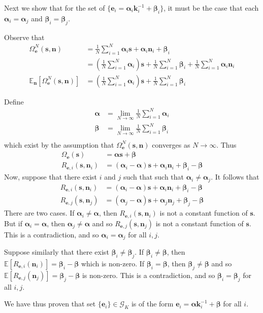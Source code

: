 \documentclass[letterpaper]{article}
\theoremstyle{definition}
\begin{document}
Next we show that for the set of $\{\bm{e}_i = \bm{\alpha}_i \bm{k}_i^{-1} + \bm{\beta}_i\}$, it must be the case that each $\bm{\alpha}_i = \bm{\alpha}_j$ and $\bm{\beta}_i = \bm{\beta}_j$.

Observe that
\begin{align*}
    \Omega_{\bm{e}}^N(\bm{s}, \bm{n}) &= \frac{1}{N} \sum_{i=1}^N \bm{\alpha}_i \bm{s} + \bm{\alpha}_i \bm{n}_i + \bm{\beta}_i \\
    &= \left( \frac{1}{N} \sum_{i=1}^N \bm{\alpha}_i \right)\bm{s} + \frac{1}{N} \sum_{i=1}^N \bm{\beta}_i  + \frac{1}{N} \sum_{i=1}^N \bm{\alpha}_i \bm{\bm{n}}_i \\
    \mathbb{E}_{\bm{n}}[\Omega_{\bm{e}}^N(\bm{s}, \bm{n})] &= \left( \frac{1}{N} \sum_{i=1}^N \bm{\alpha}_i \right)\bm{s} +  \frac{1}{N} \sum_{i=1}^N \bm{\beta}_i
\end{align*}

Define
\begin{align*}
\bm{\alpha} &= \lim_{N\to\infty}\frac{1}{N}\sum_{i=1}^N \bm{\alpha}_i \\
\bm{\beta} &= \lim_{N\to\infty}\frac{1}{N}\sum_{i=1}^N \bm{\beta}_i \\
\end{align*}
which exist by the assumption that $\Omega_{\bm{e}}^N(\bm{s}, \bm{n})$ converges as $N\to\infty$.
Thus
\begin{align*}
    \Omega_{\bm{e}}(\bm{s}) &= \bm{\alpha} \bm{s} + \bm{\beta} \\
    R_{\bm{e}, i}(\bm{s}, \bm{n}_i) &= (\bm{\alpha}_i - \bm{\alpha})\bm{s} + \bm{\alpha}_i\bm{n}_i + \bm{\beta}_i - \bm{\beta}
\end{align*}
Now, suppose that there exist $i$ and $j$ such that such that $\bm{\alpha}_i \not= \bm{\alpha}_j$.
It follows that
\begin{align*}
    R_{\bm{e}, i}(\bm{s}, \bm{n}_i) &= (\bm{\alpha}_i - \bm{\alpha})\bm{s} + \bm{\alpha}_i\bm{n}_i + \bm{\beta}_i - \bm{\beta} \\
    R_{\bm{e}, j}(\bm{s}, \bm{n}_j) &= (\bm{\alpha}_j - \bm{\alpha})\bm{s} + \bm{\alpha}_j\bm{n}_j + \bm{\beta}_j - \bm{\beta}
\end{align*}
There are two cases.
If $\bm{\alpha}_i \not=\bm{\alpha}$, then $R_{\bm{e}, i}(\bm{s}, \bm{n}_i)$ is not a constant function of $\bm{s}$.
But if $\bm{\alpha}_i =\bm{\alpha}$, then $\bm{\alpha}_j \not=\bm{\alpha}$ and so $R_{\bm{e}, j}(\bm{s}, \bm{n}_j)$ is not a constant function of $\bm{s}$.
This is a contradiction, and so $\bm{\alpha}_i = \bm{\alpha}_j$ for all $i,j$.

Suppose similarly that there exist $\bm{\beta}_i \not=\bm{\beta}_j$.
If $\bm{\beta}_i \not=\bm{\beta}$, then $\mathbb{E}[R_{\bm{e}, i}(\bm{n}_i)] = \bm{\beta}_i - \bm{\beta}$ which is non-zero.
If $\bm{\beta}_i =\bm{\beta}$, then $\bm{\beta}_j \not=\bm{\beta}$ and so $\mathbb{E}[R_{\bm{e}, j}(\bm{n}_j)] = \bm{\beta}_j - \bm{\beta}$ is non-zero.
This is a contradiction, and so $\bm{\beta}_i = \bm{\beta}_j$ for all $i,j$.

We have thus proven that set $\{ \bm{e}_i \} \in \mathcal{G}_K$ is of the form $\bm{e}_i = \bm{\alpha} \bm{k}_i^{-1} + \bm{\beta}$ for all $i$.
\end{document}
